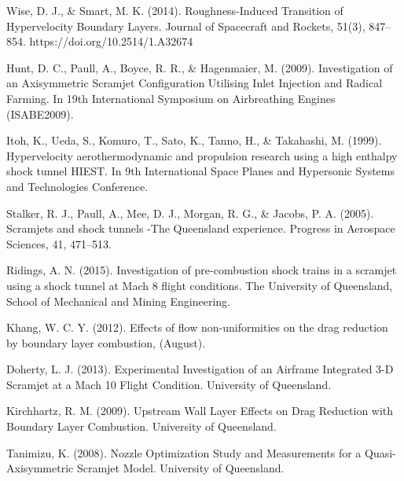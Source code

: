 \documentclass{AIAA}
\begin{document}
\begin{thebibliography}{}


Wise, D. J., \& Smart, M. K. (2014). Roughness-Induced Transition of Hypervelocity Boundary Layers. Journal of Spacecraft and Rockets, 51(3), 847–854. https://doi.org/10.2514/1.A32674


Hunt, D. C., Paull, A., Boyce, R. R., \& Hagenmaier, M. (2009). Investigation of an Axisymmetric Scramjet Configuration Utilising Inlet Injection and Radical Farming. In 19th International Symposium on Airbreathing Engines (ISABE2009).


Itoh, K., Ueda, S., Komuro, T., Sato, K., Tanno, H., \& Takahashi, M. (1999). Hypervelocity aerothermodynamic and propulsion research using a high enthalpy shock tunnel HIEST. In 9th International Space Planes and Hypersonic Systems and Technologies Conference.


Stalker, R. J., Paull, A., Mee, D. J., Morgan, R. G., \& Jacobs, P. A. (2005). Scramjets and shock tunnels -The Queensland experience. Progress in Aerospace Sciences, 41, 471–513.


Ridings, A. N. (2015). Investigation of pre-combustion shock trains in a scramjet using a shock tunnel at Mach 8 flight conditions. The University of Queensland, School of Mechanical and Mining Engineering.


Khang, W. C. Y. (2012). Effects of flow non-uniformities on the drag reduction by boundary layer combustion, (August).


Doherty, L. J. (2013). Experimental Investigation of an Airframe Integrated 3-D Scramjet at a Mach 10 Flight Condition. University of Queensland.


Kirchhartz, R. M. (2009). Upstream Wall Layer Effects on Drag Reduction with Boundary Layer Combustion. University of Queensland.


Tanimizu, K. (2008). Nozzle Optimization Study and Measurements for a Quasi-Axisymmetric Scramjet Model. University of Queensland.



\end{thebibliography}
\end{document}
